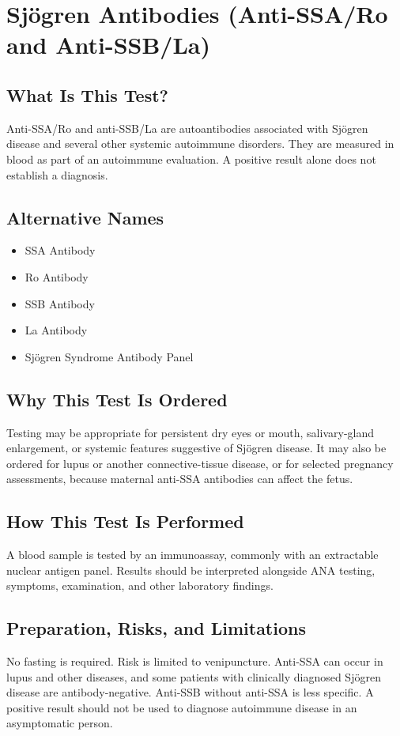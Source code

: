 \chapter{Sjögren Antibodies (Anti-SSA/Ro and Anti-SSB/La)}

\section*{What Is This Test?}
Anti-SSA/Ro and anti-SSB/La are autoantibodies associated with Sjögren disease and several other systemic autoimmune disorders. They are measured in blood as part of an autoimmune evaluation. A positive result alone does not establish a diagnosis.

\section*{Alternative Names}
\begin{itemize}
  \item SSA Antibody
  \item Ro Antibody
  \item SSB Antibody
  \item La Antibody
  \item Sjögren Syndrome Antibody Panel
\end{itemize}
\section*{Why This Test Is Ordered}
Testing may be appropriate for persistent dry eyes or mouth, salivary-gland enlargement, or systemic features suggestive of Sjögren disease. It may also be ordered for lupus or another connective-tissue disease, or for selected pregnancy assessments, because maternal anti-SSA antibodies can affect the fetus.

\section*{How This Test Is Performed}
A blood sample is tested by an immunoassay, commonly with an extractable nuclear antigen panel. Results should be interpreted alongside ANA testing, symptoms, examination, and other laboratory findings.

\section*{Preparation, Risks, and Limitations}
No fasting is required. Risk is limited to venipuncture. Anti-SSA can occur in lupus and other diseases, and some patients with clinically diagnosed Sjögren disease are antibody-negative. Anti-SSB without anti-SSA is less specific. A positive result should not be used to diagnose autoimmune disease in an asymptomatic person.

